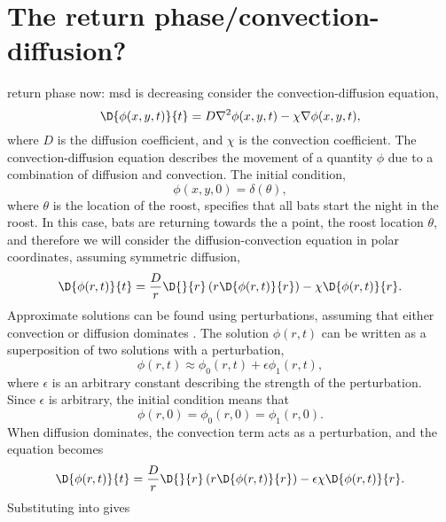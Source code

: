 
\section{The return phase/convection-diffusion?}

{\huge return phase now: msd is decreasing}
 consider the convection-diffusion equation,
%
\begin{equation}
  \D{\phi(x,y,t)}{t} = D\nabla^2\phi(x,y,t) - \chi \nabla\phi(x,y,t),
\end{equation}
%
where $D$ is the diffusion coefficient, and $\chi$ is the convection coefficient. The convection-diffusion equation describes the movement of a quantity $\phi$ due to a combination of diffusion and convection. The initial condition,
%
\begin{equation}
  \phi(x,y,0) = \delta(\theta),
\end{equation}
%
where $\theta$ is the location of the roost, specifies that all bats start the night in the roost.
%
In this case, bats are returning towards the a point, the roost location $\theta$, and therefore we will consider the diffusion-convection equation in polar coordinates, assuming symmetric diffusion,
%
\begin{equation}
  \D{\phi(r,t)}{t} = \frac{D}{r} \D{}{r}\left(r \D{\phi(r,t)}{r} \right) - \chi \D{\phi(r,t)}{r}.
\end{equation}
%
Approximate solutions can be found using perturbations, assuming that either convection or diffusion dominates \cite{hinchperturbation}. The solution $\phi(r,t)$ can be written as a superposition of two solutions with a perturbation,
%
\begin{equation}
  \phi(r,t) \approx \phi_0(r,t) + \epsilon \phi_1(r,t),
  \label{eqn:phi_perturbation}
\end{equation}
%
where $\epsilon$ is an arbitrary constant describing the strength of the perturbation. Since $\epsilon$ is arbitrary, the initial condition means that
%
\begin{equation}
  \phi(r,0) = \phi_0(r,0) = \phi_1(r,0).
\end{equation}
%
When diffusion dominates, the convection term acts as a perturbation, and the equation becomes
%
\begin{equation}
  \D{\phi(r,t)}{t} = \frac{D}{r} \D{}{r}\left(r \D{\phi(r,t)}{r} \right) - \epsilon\chi \D{\phi(r,t)}{r}.
  \label{eqn:convection_perturbation}
\end{equation}
%
Substituting  into  gives
